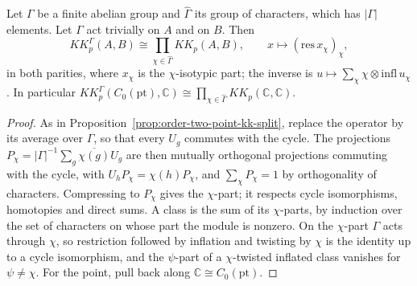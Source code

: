 \begin{proposition}\label{prop:finite-abelian-point-kk-split}
\leanok
Let $\Gamma$ be a finite abelian group and $\widehat\Gamma$ its group of characters,
which has $|\Gamma|$ elements. Let $\Gamma$ act trivially on $A$ and on $B$. Then
\[
  KK^\Gamma_p(A,B)\cong\prod_{\chi\in\widehat\Gamma}KK_p(A,B),\qquad
  x\mapsto(\mathrm{res}\,x_\chi)_\chi,
\]
in both parities, where $x_\chi$ is the $\chi$-isotypic part; the inverse is
$u\mapsto\sum_\chi\chi\otimes\mathrm{infl}\,u_\chi$. In particular
$KK^\Gamma_p(C_0(\mathrm{pt}),\mathbb C)\cong\prod_{\chi\in\widehat\Gamma}
KK_p(\mathbb C,\mathbb C)$.
\end{proposition}
\begin{proof}
\leanok
As in Proposition~\ref{prop:order-two-point-kk-split}, replace the operator by its
average over $\Gamma$, so that every $U_g$ commutes with the cycle. The projections
$P_\chi=|\Gamma|^{-1}\sum_g\overline{\chi(g)}U_g$ are then mutually orthogonal
projections commuting with the cycle, with $U_hP_\chi=\chi(h)P_\chi$, and
$\sum_\chi P_\chi=1$ by orthogonality of characters. Compressing to $P_\chi$ gives
the $\chi$-part; it respects cycle isomorphisms, homotopies and direct sums. A class
is the sum of its $\chi$-parts, by induction over the set of characters on whose
part the module is nonzero. On the $\chi$-part $\Gamma$ acts through $\chi$, so
restriction followed by inflation and twisting by $\chi$ is the identity up to a
cycle isomorphism, and the $\psi$-part of a $\chi$-twisted inflated class vanishes
for $\psi\neq\chi$. For the point, pull back along $\mathbb C\cong C_0(\mathrm{pt})$.
\end{proof}

